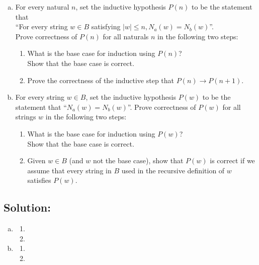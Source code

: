 \documentclass[12pt]{article}
\begin{document}
\begin{enumerate}[(a)]
    \item  For every natural $n$, set the inductive hypothesis $P(n)$ to be the statement that\\ ``For every string $w \in B$ satisfying $|w| \leq n, N_a(w) = N_b(w)$''.\\  Prove correctness of $P(n)$ for all naturals $n$ in the following two steps:

    \begin{enumerate}
        \item[(ii)]What is the base case for induction using $P(n)$? \\ Show that the base case is correct.

        \item[(iii)] Prove the correctness of the inductive step that $P(n) \rightarrow P(n + 1).$
    \end{enumerate}
    
    \item  For every string $w \in B$, set the inductive hypothesis $P(w)$ to be the statement that ``$N_a(w) = N_b(w)$''. Prove correctness of $P(w)$ for all  strings $w$  in the following two steps:

    \begin{enumerate}
        \item[(ii)]  What is the base case for induction using $P(w)$?\\  Show that the base case is correct.

        \item[(iii)]  Given $w \in B$ (and $w$ not the base case), show that $P(w)$ is correct if we assume that every string in $B$ used in the recursive definition of $w$ satisfies $P(w).$
    \end{enumerate}
\end{enumerate}

\subsection*{\textbf{Solution:}}
\begin{enumerate}[(a)]
    \item 
        \begin{enumerate}
        \item[(ii)]
        \item[(iii)]
        \end{enumerate}
       \item 
        \begin{enumerate}
        \item[(ii)]
        \item[(iii)]
        \end{enumerate}     
\end{enumerate}
\end{document}
